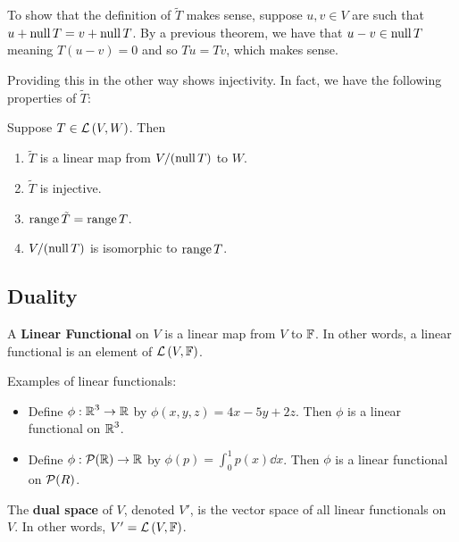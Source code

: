 To show that the definition of $\tilde{T}$ makes sense, suppose $u,v \in V$
are such that $u + \operatorname{null} T = v + \operatorname{null} T$. By a previous theorem, we have
that $u - v \in \operatorname{null} T$ meaning $T (u-v) = 0$ and so $Tu = Tv$, which makes sense.

Providing this in the other way shows injectivity. In fact, we have
the following properties of $\tilde{T}$:

\begin{theorem}
   Suppose $T \in \mathcal{L} \left( V, W \right)$. Then
   \begin{enumerate}
      \item $\tilde{T}$ is a linear map from $V / (\operatorname{null} T)$ to $W$.
      \item $\tilde{T}$ is injective.
      \item $\operatorname{range} \tilde{T} = \operatorname{range} T$.
      \item $V / (\operatorname{null} T)$ is isomorphic to $\operatorname{range} T$.
   \end{enumerate}
\end{theorem}

\subsection{Duality}

\begin{definition} 
   A \textbf{Linear Functional} on $V$ is a linear map
   from $V$ to $\operatorname{\mathbb{F}}$. In other words, a linear functional is
   an element of $\mathcal{L} \left( V, \operatorname{\mathbb{F}} \right)$.
\end{definition}

\begin{example} Examples of linear functionals:
   \begin{itemize}
      \item Define $\phi: \operatorname{\mathbb{R}}^3 \to \operatorname{\mathbb{R}}$ by $\phi(x, y, z) = 4x-5y+2z$. Then
      $\phi$ is a linear functional on $\operatorname{\mathbb{R}}^3$.
      \item Define $\phi: \mathcal{P}(\operatorname{\mathbb{R}}) \to \operatorname{\mathbb{R}}$ by $\phi(p) = \int_{0}^1 p(x) \dd{x}$. Then
      $\phi$ is a linear functional on $\mathcal{P}(R)$.
   \end{itemize}
\end{example}

\begin{definition} 
   The \textbf{dual space} of $V$, denoted $V'$, is the vector space
   of all linear functionals on $V$. In other words, $V' = \mathcal{L} \left( V, \operatorname{\mathbb{F}} \right)$.
\end{definition}

